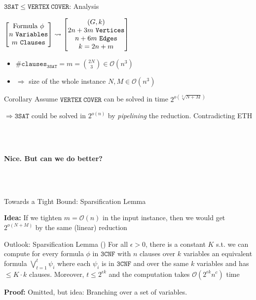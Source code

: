 \begin{frame}[c]{$\mathtt{3SAT} \leq \mathtt{VERTEX~COVER}$: Analysis}
\begin{center}

$\begin{bmatrix}
   \text{Formula~} \phi \\
   n \mathtt{~Variables} \\
   m \mathtt{~Clauses} \\
\end{bmatrix} \rightsquigarrow	
\begin{bmatrix}
   \text (G, k)\\
   2n + 3m \mathtt{~Vertices} \\
   n + 6m \mathtt{~Edges} \\
   k = 2n + m
\end{bmatrix} 
$

\begin{itemize}
       \item $\#\mathtt{clauses}_{\mathtt{3SAT}} = m = \binom{2N}{3} \in \mathcal{O}(n^3)$
       \item $\Rightarrow$ size of the whole instance $N,M \in \mathcal{O}(n^3)$
\end{itemize}
      
\pause\begin{block}{Corollary}
Assume $\mathtt{VERTEX~COVER}$ can be solved in time $2^{o(\sqrt[3]{N+M})}$

$\Rightarrow \mathtt{3SAT}$ could be solved in $2^{o(n)}$ by \textit{pipelining} the reduction. \textbf{\textcolor{red}{\text{\faBolt}}}
 Contradicting ETH
 
\end{block}

\\~ 
\begin{center}
    \pause\textbf{Nice. But can we do better?}
\end{center}
\\~ 
\end{center}
\end{frame}

\begin{frame}[c]{Towards a Tight Bound: Sparsification Lemma}

\textbf{Idea: }If we tighten $m = \mathcal{O}(n)$ in the input instance, then we would get $2^{o(N+M)}$ by the same (linear) reduction

\begin{block}{Outlook: Sparsification Lemma (\cite{sparslem})}{
For all $\epsilon > 0$, there is a constant $K$ s.t. we can compute for every formula $\phi$ in $\mathtt{3CNF}$ with $n$ clauses over $k$ variables an equivalent formula $\bigvee_{t=1}^t \psi_i$ where each $\psi_i$ is in $\mathtt{3CNF}$ and over the same $k$ variables and has $\leq K \cdot k$ clauses. Moreover, $t \leq 2^{\epsilon k}$ and the computation takes $\mathcal{O}(2^{\epsilon k}n^c)$ time
}
\end{block}
\textbf{Proof: } Omitted, but idea: Branching over a set of variables.
\end{frame}

